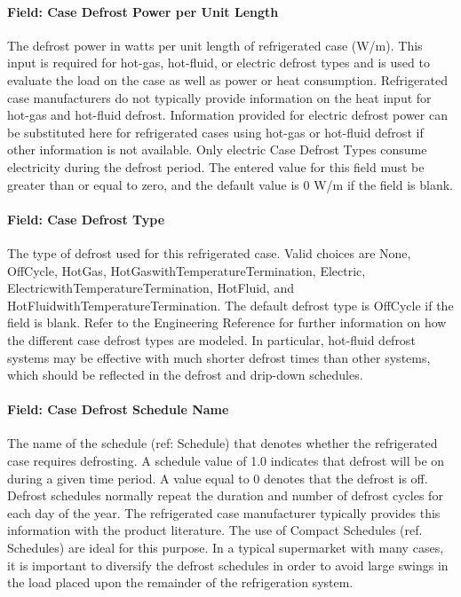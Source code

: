 \paragraph{Field: Case Defrost Power per Unit Length}\label{field-case-defrost-power-per-unit-length}

The defrost power in watts per unit length of refrigerated case (W/m). This input is required for hot-gas, hot-fluid, or electric defrost types and is used to evaluate the load on the case as well as power or heat consumption. Refrigerated case manufacturers do not typically provide information on the heat input for hot-gas and hot-fluid defrost. Information provided for electric defrost power can be substituted here for refrigerated cases using hot-gas or hot-fluid defrost if other information is not available. Only electric Case Defrost Types consume electricity during the defrost period. The entered value for this field must be greater than or equal to zero, and the default value is 0 W/m if the field is blank.

\paragraph{Field: Case Defrost Type}\label{field-case-defrost-type}

The type of defrost used for this refrigerated case. Valid choices are None, OffCycle, HotGas, HotGaswithTemperatureTermination, Electric, ElectricwithTemperatureTermination, HotFluid, and HotFluidwithTemperatureTermination. The default defrost type is OffCycle if the field is blank. Refer to the Engineering Reference for further information on how the different case defrost types are modeled. In particular, hot-fluid defrost systems may be effective with much shorter defrost times than other systems, which should be reflected in the defrost and drip-down schedules.

\paragraph{Field: Case Defrost Schedule Name}\label{field-case-defrost-schedule-name}

The name of the schedule (ref: Schedule) that denotes whether the refrigerated case requires defrosting. A schedule value of 1.0 indicates that defrost will be on during a given time period. A value equal to 0 denotes that the defrost is off. Defrost schedules normally repeat the duration and number of defrost cycles for each day of the year. The refrigerated case manufacturer typically provides this information with the product literature. The use of Compact Schedules (ref. Schedules) are ideal for this purpose. In a typical supermarket with many cases, it is important to diversify the defrost schedules in order to avoid large swings in the load placed upon the remainder of the refrigeration system.

